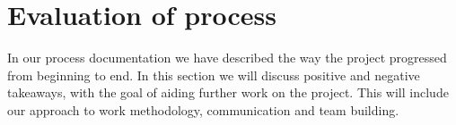 \section{Evaluation of process}
In our process documentation we have described the way the project progressed from beginning to end. In this section we will discuss positive and negative takeaways, with the goal of aiding further work on the project. This will include our approach to work methodology, communication and team building. 

